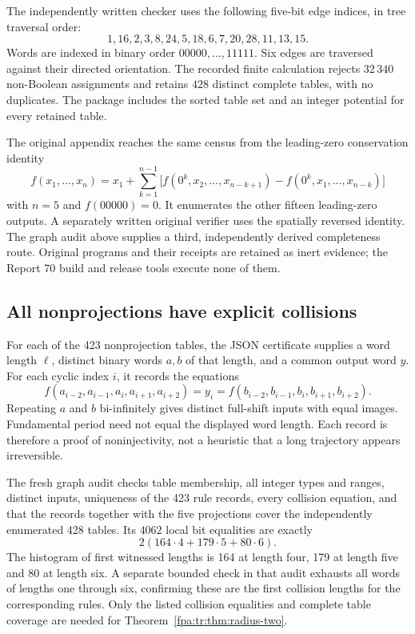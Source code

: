 \documentclass[11pt,a4paper]{article}
\numberwithin{equation}{section}
\begin{document}
The independently written checker uses the following five-bit edge indices, in tree traversal order:
\[
1,16,2,3,8,24,5,18,6,7,20,28,11,13,15.
\]
Words are indexed in binary order $00000,\ldots,11111$. Six edges are traversed against their directed orientation. The recorded finite calculation rejects $32\,340$ non-Boolean assignments and retains $428$ distinct complete tables, with no duplicates. The package includes the sorted table set and an integer potential for every retained table.

The original appendix reaches the same census from the leading-zero conservation identity
\begin{equation}\label{fpa:tr:eq:identity}
f(x_1,\ldots,x_n)=x_1+\sum_{k=1}^{n-1}
\bigl[f(0^k,x_2,\ldots,x_{n-k+1})-f(0^k,x_1,\ldots,x_{n-k})\bigr]
\end{equation}
with $n=5$ and $f(00000)=0$. It enumerates the other fifteen leading-zero outputs. A separately written original verifier uses the spatially reversed identity. The graph audit above supplies a third, independently derived completeness route. Original programs and their receipts are retained as inert evidence; the Report 70 build and release tools execute none of them.

\subsection{All nonprojections have explicit collisions}
For each of the 423 nonprojection tables, the JSON certificate supplies a word length $\ell$, distinct binary words $a,b$ of that length, and a common output word $y$. For each cyclic index $i$, it records the equations
\[
f(a_{i-2},a_{i-1},a_i,a_{i+1},a_{i+2})=y_i
=f(b_{i-2},b_{i-1},b_i,b_{i+1},b_{i+2}).
\]
Repeating $a$ and $b$ bi-infinitely gives distinct full-shift inputs with equal images. Fundamental period need not equal the displayed word length. Each record is therefore a proof of noninjectivity, not a heuristic that a long trajectory appears irreversible.

The fresh graph audit checks table membership, all integer types and ranges, distinct inputs, uniqueness of the 423 rule records, every collision equation, and that the records together with the five projections cover the independently enumerated 428 tables. Its $4062$ local bit equalities are exactly
\[
2(164\cdot4+179\cdot5+80\cdot6).
\]
The histogram of first witnessed lengths is 164 at length four, 179 at length five and 80 at length six. A separate bounded check in that audit exhausts all words of lengths one through six, confirming these are the first collision lengths for the corresponding rules. Only the listed collision equalities and complete table coverage are needed for Theorem~\ref{fpa:tr:thm:radius-two}.
\end{document}
